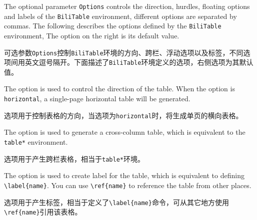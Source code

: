\begin{ParaColumn}
    The optional parameter \verb"Options" controls the direction, hurdles, floating options and labels of the \verb"BiliTable" environment, different options are separated by commas. The following describes the options defined by the \verb"BiliTable" environment, The option on the right is its default value.

    \switchcolumn

    可选参数\verb"Options"控制\verb"BiliTable"环境的方向、跨栏、浮动选项以及标签，不同选项间用英文逗号隔开。下面描述了\verb"BiliTable"环境定义的选项，右侧选项为其默认值。

    \switchcolumn*

    The  option is used to control the direction of the table. When the  option is \verb"horizontal", a single-page horizontal table will be generated.

    \switchcolumn

    选项用于控制表格的方向，当选项为\verb"horizontal"时，将生成单页的横向表格。

    \switchcolumn*

    The  option is used to generate a cross-column table, which is equivalent to the \verb"table*" environment.
    
    \switchcolumn

    选项用于产生跨栏表格，相当于\verb"table*"环境。

    \switchcolumn*

    The  option is used to create label for the table, which is equivalent to defining \verb"\label{name}". You can use \verb"\ref{name}" to reference the table from other places.

    \switchcolumn

    选项用于产生标签，相当于定义了\verb"\label{name}"命令，可从其它地方使用\verb"\ref{name}"引用该表格。


\end{ParaColumn}
